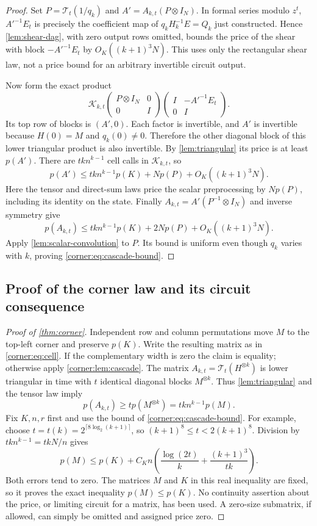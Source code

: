 \begin{proof}
Set $P=\mathcal T_t(1/q_k)$ and
$A'=A_{k,t}(P\otimes I_N)$.  In formal series modulo $z^t$,
$A'^{-1}E_t$ is precisely the coefficient map of
$q_kH_k^{-1}E=Q_k$ just constructed.  Hence
\cref{lem:shear-dag}, with zero output rows omitted, bounds the
price of the shear with block $-A'^{-1}E_t$ by
$O_K((k+1)^3N)$.  This uses only the rectangular shear law, not a
price bound for an arbitrary invertible circuit output.

Now form the exact product
\begin{equation}
 \mathcal K_{k,t}
 \begin{pmatrix}P\otimes I_N&0\\0&I\end{pmatrix}
 \begin{pmatrix}I&-A'^{-1}E_t\\0&I\end{pmatrix}.
 \label{corner:eq:state-elimination}
\end{equation}
Its top row of blocks is $(A',0)$.  Each factor is invertible, and
$A'$ is invertible because $H(0)=M$ and $q_k(0)\ne0$.  Therefore
the other diagonal block of this lower triangular product is also
invertible.  By \cref{lem:triangular} its price is at least $p(A')$.
There are $tkn^{k-1}$ cell calls in $\mathcal K_{k,t}$, so
\[
 p(A')\le tkn^{k-1}p(K)+N p(P)+O_K((k+1)^3N).
\]
Here the tensor and direct-sum laws price the scalar preprocessing
by $Np(P)$, including its identity on the state.  Finally
$A_{k,t}=A'(P^{-1}\otimes I_N)$ and inverse symmetry give
\[
 p(A_{k,t})\le tkn^{k-1}p(K)+2Np(P)+O_K((k+1)^3N).
\]
Apply \cref{lem:scalar-convolution} to $P$.  Its bound is uniform
even though $q_k$ varies with $k$, proving
\cref{corner:eq:cascade-bound}.
\end{proof}

\subsection{Proof of the corner law and its circuit consequence}

\begin{proof}[Proof of \cref{thm:corner}]
Independent row and column permutations move $M$ to the top-left
corner and preserve $p(K)$.  Write the resulting matrix as in
\cref{corner:eq:cell}.  If the complementary width is zero the claim
is equality; otherwise apply \cref{corner:lem:cascade}.  The matrix
$A_{k,t}=\mathcal T_t(H^{\otimes k})$ is lower triangular in time
with $t$ identical diagonal blocks $M^{\otimes k}$.  Thus
\cref{lem:triangular} and the tensor law imply
\[
 p(A_{k,t})\ge t p(M^{\otimes k})
             =tkn^{k-1}p(M).
\]
Fix $K,n,r$ first and use the bound of
\cref{corner:eq:cascade-bound}.  For example, choose
$t=t(k)=2^{\lceil8\log_2(k+1)\rceil}$, so
$(k+1)^8\le t<2(k+1)^8$.  Division by $tkn^{k-1}=tkN/n$ gives
\[
 p(M)\le p(K)+C_K n\left(
       \frac{\log(2t)}{k}+\frac{(k+1)^3}{tk}\right).
\]
Both errors tend to zero.  The matrices $M$ and $K$ in this real
inequality are fixed, so it proves the exact inequality
$p(M)\le p(K)$.  No continuity assertion about the price, or
limiting circuit for a matrix, has been used.  A zero-size submatrix,
if allowed, can simply be omitted and assigned price zero.
\end{proof}

